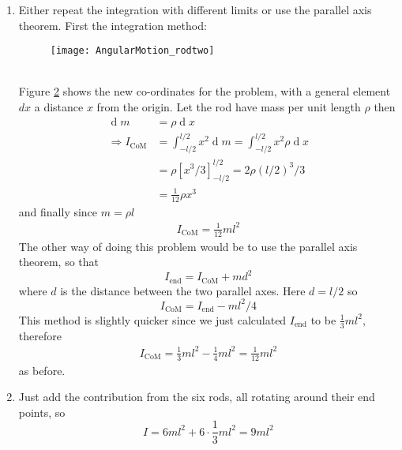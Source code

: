 \begin{hint}
{\begin{enumerate}
\begin{figure}[h]
\centering
\texttt{[image: AngularMotion\_rod]}
\caption{}
\label{fig:AngularMotion_rod}
\end{figure}
\\
$I=\int x^2dm$ and $dm=\rho dx$ for mass per unit length $\rho$,  therefore
\begin{equation*}
I=\int^l_0\rho x^2dx=\rho[x^3/3]^l_0=\rho l\cdot l^2/3=\frac{1}{3}ml^2
\end{equation*}
\item Either repeat the integration with different limits or use the parallel axis theorem. First the integration method:
\begin{figure}[h] 
\centering
\texttt{[image: AngularMotion\_rodtwo]}
\caption{}
\label{fig:AngularMotion_rodtwo}
\end{figure}
\\
Figure \ref{fig:AngularMotion_rodtwo} shows the new co-ordinates for the problem, with a general element $dx$ a distance $x$ from the origin. Let the rod have mass per unit length $\rho$ then 
\begin{align*}
\operatorname{d}\!m&=\rho \operatorname{d}\!x \\
\Rightarrow I_{\textrm{CoM}}&=\int_{-l/2}^{l/2}x^2\operatorname{d}\!m=\int_{-l/2}^{l/2}x^2\rho\operatorname{d}\!x \\
&=\rho[x^3/3]_{-l/2}^{l/2}=2\rho(l/2)^3/3 \\
&=\frac{1}{12}\rho x^3
\end{align*}
and finally since $m=\rho l$
\begin{align*}
I_{\textrm{CoM}}=\frac{1}{12}ml^2
\end{align*}
The other way of doing this problem would be to use the parallel axis theorem, so that
\begin{equation*}
I_{\textrm{end}}=I_{\textrm{CoM}}+md^2 
\end{equation*}
where $d$ is the distance between the two parallel axes. Here $d=l/2$ so
\begin{equation*}
I_{\textrm{CoM}}=I_{\textrm{end}}-ml^2/4
\end{equation*}
This method is slightly quicker since we just calculated $I_{\textrm{end}}$ to be $\frac{1}{3}ml^2$, therefore
\begin{align*}
I_{\textrm{CoM}}=\frac{1}{3}ml^2-\frac{1}{4}ml^2=\frac{1}{12}ml^2 
\end{align*}
as before.
\item Just add the contribution from the six rods, all rotating around their end points, so 
\begin{equation*}
I=6ml^2+6\cdot\frac{1}{3}ml^2=9ml^2
\end{equation*}
\end{enumerate}
}
\end{hint}